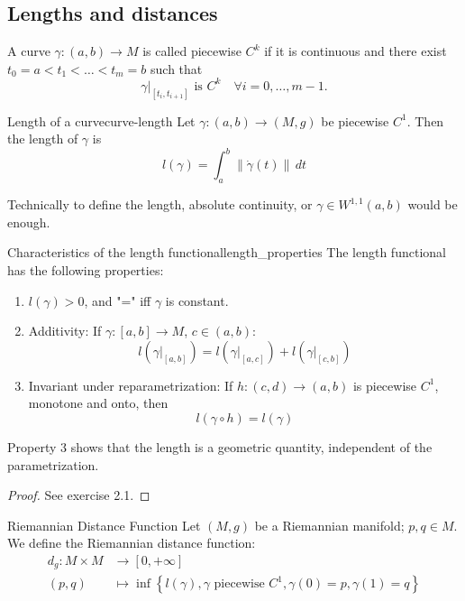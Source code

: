 \subsection{Lengths and distances}

A curve \(\gamma: (a,b) \to M\) is called piecewise \(C^k\) if it is continuous and there exist \(t_0 = a < t_1 < \dots < t_m = b\) such that
\[
\gamma|_{[t_i, t_{i+1}]} \text{ is } C^k \quad \forall i = 0, \dots, m-1.
\]

\begin{colordef}{Length of a curve}{curve-length}
Let \(\gamma: (a,b) \to (M, g)\) be piecewise \(C^1\). Then the length of \(\gamma\) is
\[
l(\gamma) = \int_a^b \|\dot\gamma(t)\| \, dt
\]
\end{colordef}

Technically to define the length, absolute continuity, or $\gamma\in W^{1,1}(a,b)$ would be enough.

\begin{colorlem}{Characteristics of the length functional}{length_properties}
The length functional has the following properties:

\begin{enumerate}
    \item \( l(\gamma) > 0 \), and "=" iff \(\gamma\) is constant.
    \item Additivity: If \(\gamma : [a,b] \to M\), \(c \in (a,b)\):
    \[
    l(\gamma|_{[a,b]}) = l(\gamma|_{[a,c]}) + l(\gamma|_{[c,b]})
    \]
    \item Invariant under reparametrization:
    If \( h : (c,d) \to (a,b) \) is piecewise \(C^1\), monotone and onto, then
    \[
    l(\gamma \circ h) = l(\gamma)
    \]
\end{enumerate}
\end{colorlem}
Property 3 shows that the length is a geometric quantity, independent of the parametrization.
\begin{proof}
See exercise 2.1.
\end{proof}

\begin{colordef}{Riemannian Distance Function}{}
Let \((M,g)\) be a Riemannian manifold; \(p, q \in M\). We define the Riemannian distance function:
\begin{align*}
    d_g : M \times M &\to [0, +\infty]\\
    (p, q) &\mapsto \inf
    \left\{ l(\gamma), \gamma \text{ piecewise } C^1, \gamma(0) = p, \gamma(1) = q \right\}
\end{align*}
\end{colordef}

